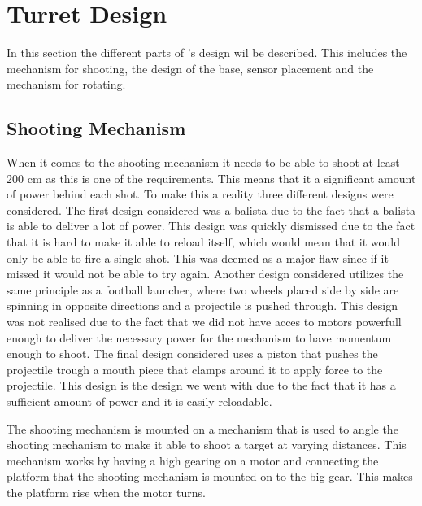 \section{Turret Design}
In this section the different parts of \namep's design wil be described. This
includes the mechanism for shooting, the design of the base, sensor placement
and the mechanism for rotating.

\subsection{Shooting Mechanism}
When it comes to the shooting mechanism it needs to be able to shoot at least
200 cm as this is one of the requirements. This means that it a significant
amount of power behind each shot. To make this a reality three different designs
were considered. The first design considered was a balista due to the fact that
a balista is able to deliver a lot of power. This design was quickly dismissed
due to the fact that it is hard to make it able to reload itself, which would
mean that it would only be able to fire a single shot. This was deemed as a
major flaw since if it missed it would not be able to try again. Another design
considered utilizes the same principle as a football launcher, where two wheels
placed side by side are spinning in opposite directions and a projectile is
pushed through. 
This design was not realised due to the fact that we did not have acces to motors
powerfull enough to deliver the necessary power for the mechanism to have
momentum enough to shoot. The final design considered uses a piston that pushes
the projectile trough a mouth piece that clamps around it to apply force to the
projectile. This design is the design we went with due to the fact that it has
a sufficient amount of power and it is easily reloadable.\nl

The shooting mechanism is mounted on a mechanism that is used to angle the
shooting mechanism to make it able to shoot a target at varying distances. This
mechanism works by having a high gearing on a motor and connecting the platform
that the shooting mechanism is mounted on to the big gear. This makes the
platform rise when the motor turns.

